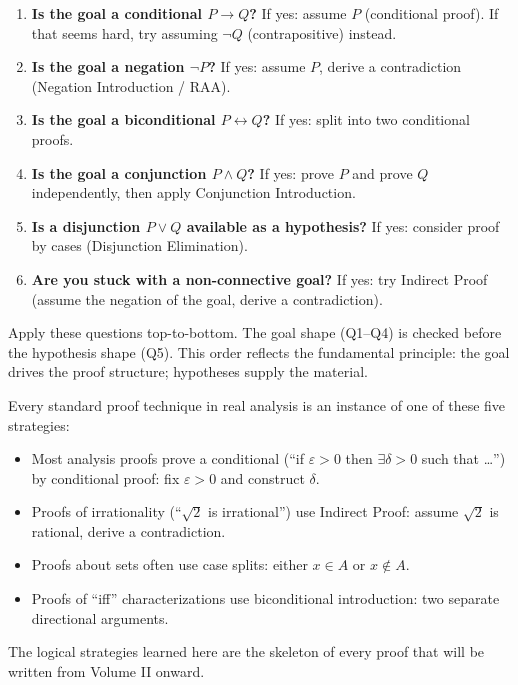 \begin{tcolorbox}[colback=gray!6, colframe=gray!40, arc=2pt,
  left=6pt, right=6pt, top=4pt, bottom=4pt,
  title={\small\textbf{Strategy Selection: Questions to Ask}},
  fonttitle=\small\bfseries]
\small
\begin{enumerate}[label=\textbf{Q\arabic*.}]
\item \textbf{Is the goal a conditional $P \to Q$?}
  If yes: assume $P$ (conditional proof). If that seems hard, try assuming
  $\neg Q$ (contrapositive) instead.

\item \textbf{Is the goal a negation $\neg P$?}
  If yes: assume $P$, derive a contradiction (Negation Introduction / RAA).

\item \textbf{Is the goal a biconditional $P \leftrightarrow Q$?}
  If yes: split into two conditional proofs.

\item \textbf{Is the goal a conjunction $P \wedge Q$?}
  If yes: prove $P$ and prove $Q$ independently, then apply Conjunction Introduction.

\item \textbf{Is a disjunction $P \vee Q$ available as a hypothesis?}
  If yes: consider proof by cases (Disjunction Elimination).

\item \textbf{Are you stuck with a non-connective goal?}
  If yes: try Indirect Proof (assume the negation of the goal, derive a
  contradiction).
\end{enumerate}
\end{tcolorbox}

\begin{remark}
Apply these questions top-to-bottom. The goal shape (Q1--Q4) is checked before
the hypothesis shape (Q5). This order reflects the fundamental principle: the
goal drives the proof structure; hypotheses supply the material.
\end{remark}

\begin{remark}
Every standard proof technique in real analysis is an instance of one of these
five strategies:
\begin{itemize}
\item Most analysis proofs prove a conditional (``if $\varepsilon > 0$ then
  $\exists \delta > 0$ such that \ldots'') by conditional proof: fix
  $\varepsilon > 0$ and construct $\delta$.
\item Proofs of irrationality (``$\sqrt{2}$ is irrational'') use Indirect
  Proof: assume $\sqrt{2}$ is rational, derive a contradiction.
\item Proofs about sets often use case splits: either $x \in A$ or $x \notin A$.
\item Proofs of ``iff'' characterizations use biconditional introduction: two
  separate directional arguments.
\end{itemize}
The logical strategies learned here are the skeleton of every proof that will
be written from Volume II onward.
\end{remark}
